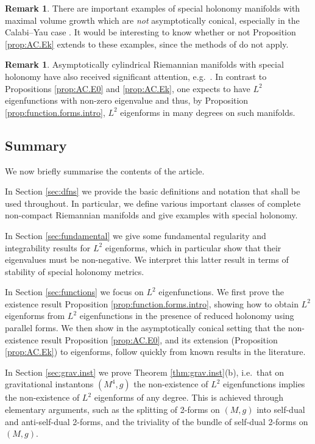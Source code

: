 \documentclass{article}
\theoremstyle{definition}
\newtheorem{rmk}[thm]{Remark}
\numberwithin{thm}{section}
\numberwithin{equation}{section}
\begin{document}
\begin{rmk}
There are important examples of special holonomy manifolds with maximal volume growth which are \emph{not} asymptotically conical, especially in the Calabi--Yau case \cite{ConlonRochon,Li,Sz}.  It would be interesting to know whether or not Proposition \ref{prop:AC.Ek} extends to these examples, since the methods of \cite{Melrose} do not apply.
\end{rmk}

\begin{rmk}
    Asymptotically cylindrical Riemannian manifolds with special holonomy have also received significant attention, e.g.~\cite{HHN,Kovalev,KovNor}.  In contrast to Propositions \ref{prop:AC.E0} and \ref{prop:AC.Ek}, one expects to have $L^2$ eigenfunctions with non-zero eigenvalue and thus, by Proposition \ref{prop:function.forms.intro}, $L^2$ eigenforms in many degrees on such manifolds.
\end{rmk}


\subsection{Summary}

We now briefly summarise the contents of the article.

In Section \ref{sec:dfns} we provide the basic definitions and notation that shall be used throughout.  In particular, we define various important classes of complete non-compact Riemannian manifolds and give  examples with special holonomy.

In Section \ref{sec:fundamental} we give some fundamental regularity and integrability results for $L^2$ eigenforms, which in particular show that their eigenvalues must be non-negative.  We interpret this latter result in terms of stability of special holonomy metrics.

In Section \ref{sec:functions} we focus on $L^2$ eigenfunctions.  We first prove the existence result Proposition \ref{prop:function.forms.intro}, showing how to obtain $L^2$ eigenforms from $L^2$ eigenfunctions in the presence of reduced holonomy using parallel forms.  We then show in the asymptotically conical setting that the non-existence result Proposition \ref{prop:AC.E0},  and its extension (Proposition \ref{prop:AC.Ek}) to eigenforms, follow quickly from known results in the literature.

In Section \ref{sec:grav.inst} we prove Theorem \ref{thm:grav.inst}(b), i.e.~that on gravitational instantons $(M^4,g)$ the non-existence of $L^2$ eigenfunctions implies the non-existence of $L^2$ eigenforms of any degree.  This is achieved through elementary arguments, such as the splitting of 2-forms on $(M,g)$ into self-dual and anti-self-dual 2-forms, and the triviality of the bundle of self-dual 2-forms on $(M,g)$.
\end{document}
